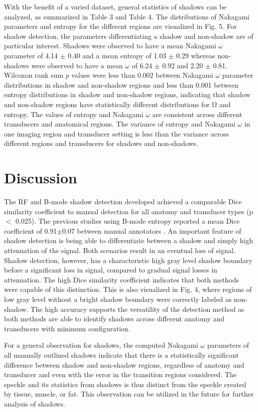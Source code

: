 \documentclass[authoryear,preprint,review,12pt]{elsarticle}
\begin{document}
With the benefit of a varied dataset, general statistics of shadows can be analyzed, as summarized in Table 3 and Table 4. The distributions of Nakagami parameters and entropy for the different regions are visualized in Fig. 5. For shadow detection, the parameters differentiating a shadow and non-shadow are of particular interest. Shadows were observed to have a mean Nakagami $\omega$ parameter of 4.14 $\pm$ 0.40 and a mean entropy of 1.03 $\pm$ 0.29 whereas non-shadows were observed to have a mean $\omega$ of 6.24 $\pm$ 0.92 and 2.20 $\pm$ 0.81. Wilcoxon rank sum $p$ values were less than 0.002 between Nakagami $\omega$ parameter distributions in shadow and non-shadow regions and less than 0.001 between entropy distributions in shadow and non-shadow regions, indicating that shadow and non-shadow regions have statistically different distributions for Ω and entropy. The values of entropy and Nakagami $\omega$ are consistent across different transducers and anatomical regions. The variance of entropy and Nakagami $\omega$ in one imaging region and transducer setting is less than the variance across different regions and transducers for shadows and non-shadows. 


\section*{Discussion}
\label{Discuss}
The RF and B-mode shadow detection developed achieved a comparable Dice similarity coefficient to manual detection for all anatomy and transducer types (p $<$ 0.025). The previous studies using B-mode entropy reported a mean Dice coefficient of 0.91$\pm$0.07 between manual annotators  \citep{Hellier2010}. An important feature of shadow detection is being able to differentiate between a shadow and simply high attenuation of the signal. Both scenarios result in an eventual loss of signal. Shadow detection, however, has a characteristic high gray level shadow boundary before a significant loss in signal, compared to gradual signal losses in attenuation. The high Dice similarity coefficient indicates that both methods were capable of this distinction. This is also visualized in Fig. 4, where regions of low gray level without a bright shadow boundary were correctly labeled as non-shadow. The high accuracy supports the versatility of the detection method as both methods are able to identify shadows across different anatomy and transducers with minimum configuration. 

For a general observation for shadows, the computed Nakagami $\omega$ parameters of all manually outlined shadows indicate that there is a statistically significant difference between shadow and non-shadow regions, regardless of anatomy and transducer and even with the error in the transition regions considered. The speckle and its statistics from shadows is thus distinct from the speckle created by tissue, muscle, or fat. This observation can be utilized in the future for further analysis of shadows. 
\end{document}
